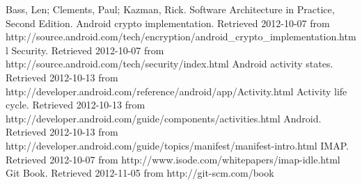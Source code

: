\documentclass[12pt]{report}
\begin{document}
\begin{thebibliography}{99}
 Bass, Len; Clements, Paul; Kazman, Rick. Software Architecture in Practice, Second Edition.
 Android crypto implementation. Retrieved 2012-10-07 from http://source.android.com/tech/encryption/android\_crypto\_implementation.html
 Security. Retrieved 2012-10-07 from http://source.android.com/tech/security/index.html
 Android activity states. Retrieved 2012-10-13 from http://developer.android.com/reference/android/app/Activity.html
 Activity life cycle. Retrieved 2012-10-13 from http://developer.android.com/guide/components/activities.html
 Android. Retrieved 2012-10-13 from http://developer.android.com/guide/topics/manifest/manifest-intro.html
 IMAP. Retrieved 2012-10-07 from http://www.isode.com/whitepapers/imap-idle.html
 Git Book. Retrieved 2012-11-05 from http://git-scm.com/book


\end{thebibliography}
\end{document}
